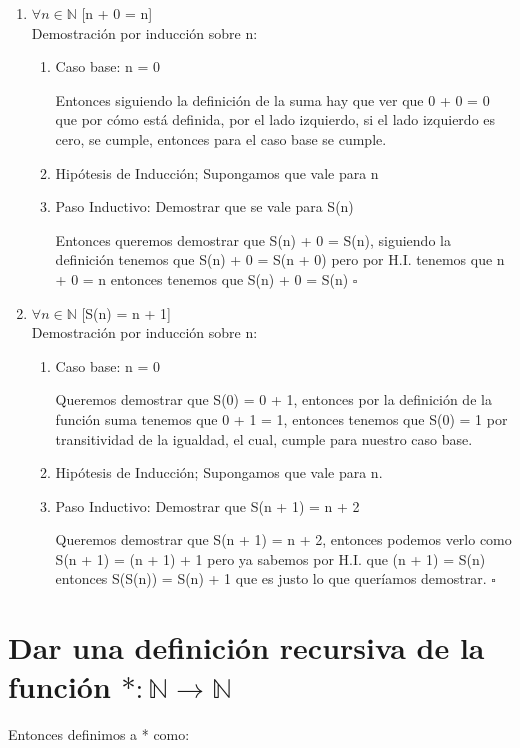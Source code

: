 \documentclass[11pt,letterpaper]{article}
\newcommand*{\QEDB}{\hfill\ensuremath{\square}}%
\begin{document}
\begin{enumerate}
\item $\forall n\in\mathbb{N}$ [n + 0 = n]\\
Demostración por inducción sobre n:
\begin{enumerate}
\item Caso base: n = 0

Entonces siguiendo la definición de la suma hay que ver que 0 + 0 = 0 que por cómo está definida, por el lado izquierdo, si el lado izquierdo es cero, se cumple, entonces para el caso base se cumple.

\item Hipótesis de Inducción; Supongamos que vale para n

\item Paso Inductivo: Demostrar que se vale para S(n)

Entonces queremos demostrar que S(n) + 0 = S(n), siguiendo la definición tenemos que S(n) + 0 = S(n + 0) pero por H.I. tenemos que n + 0 = n entonces tenemos que S(n) + 0 = S(n)
\QEDB
\end{enumerate}
\item $\forall n\in\mathbb{N}$ [S(n) = n + 1]\\
Demostración por inducción sobre n:
\begin{enumerate}
\item Caso base: n = 0

Queremos demostrar que S(0) = 0 + 1, entonces por la definición de la función suma tenemos que 0 + 1 = 1, entonces tenemos que S(0) = 1 por transitividad de la igualdad, el cual, cumple para nuestro caso base.

\item Hipótesis de Inducción; Supongamos que vale para n.

\item Paso Inductivo: Demostrar que S(n + 1) = n + 2

Queremos demostrar que S(n + 1) = n + 2, entonces podemos verlo como S(n + 1) = (n + 1) + 1
pero ya sabemos por H.I. que (n + 1) = S(n) entonces S(S(n)) = S(n) + 1 que es justo lo que queríamos demostrar.
\QEDB

\end{enumerate}
\end{enumerate}
\section {Dar una definición recursiva de la función $*:\mathbb N\to\mathbb N$}
Entonces definimos a * como:\\
\end{document}
